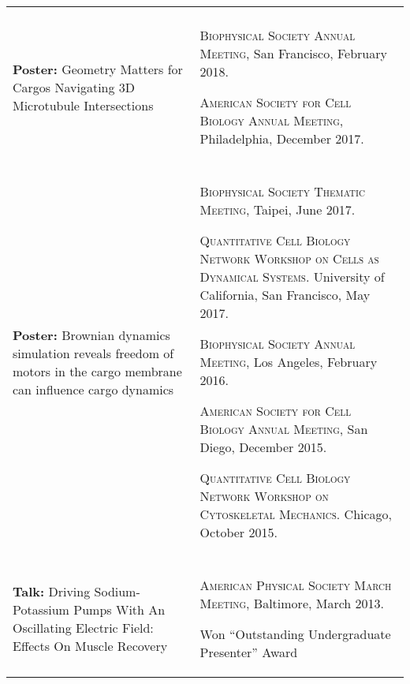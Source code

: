 \documentclass[letterpaper,10pt]{article} %
\makeatletter
\newcommand\cellwidth{\TX@col@width}
\makeatother
\begin{document}
\begin{tabularx}{\textwidth}{p{} | X}
\multicolumn{2}{c}{} \\

\begin{minipage}{.4\textwidth}
\textbf{Poster:} Geometry Matters for Cargos Navigating 3D Microtubule Intersections
\end{minipage}
&
\begin{minipage}{\cellwidth}
\begin{description}[itemsep=.25ex,labelsep=0em]
\item \textsc{Biophysical Society Annual Meeting}, San Francisco, February 2018.
\item \textsc{American Society for Cell Biology Annual Meeting}, Philadelphia, December 2017.
\end{description}
\end{minipage} \\

\multicolumn{2}{c}{} \\

\begin{minipage}{.4\textwidth}
\textbf{Poster:} Brownian dynamics simulation reveals freedom of motors in the cargo membrane can influence cargo dynamics
\end{minipage}
&
\begin{minipage}{\cellwidth}
\begin{description}[itemsep=.25ex,labelsep=0em]
\item \textsc{Biophysical Society Thematic Meeting}, Taipei, June 2017.
\item \textsc{Quantitative Cell Biology Network Workshop on Cells as Dynamical Systems.} University of California, San Francisco, May 2017.
\item \textsc{Biophysical Society Annual Meeting}, Los Angeles, February 2016.
\item \textsc{American Society for Cell Biology Annual Meeting}, San Diego, December 2015.
\item \textsc{Quantitative Cell Biology Network Workshop on Cytoskeletal Mechanics.} Chicago, October 2015.
\end{description}
\end{minipage} \\

\multicolumn{2}{c}{} \\

\begin{minipage}{.4\textwidth}
\textbf{Talk:} Driving Sodium-Potassium Pumps With An Oscillating Electric Field: Effects On Muscle Recovery
\end{minipage}
&
\begin{minipage}{\cellwidth}
\begin{description}[itemsep=.25ex,labelsep=0em]
\item \textsc{American Physical Society March Meeting}, Baltimore, March 2013.
\item Won ``Outstanding Undergraduate Presenter'' Award
\end{description}
\end{minipage} 
\end{tabularx}
\end{document}
